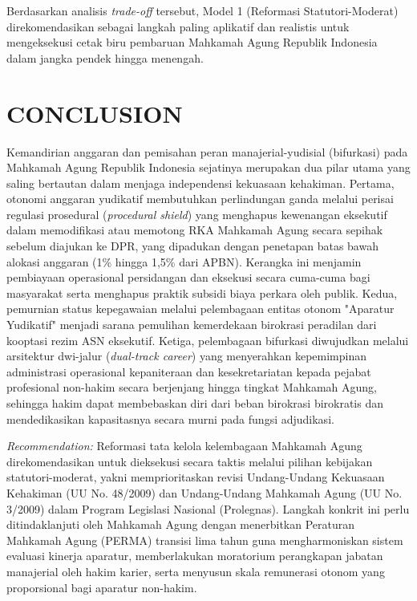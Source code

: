 \documentclass[12pt, a4paper]{article}
\begin{document}
Berdasarkan analisis \textit{trade-off} tersebut, Model 1 (Reformasi Statutori-Moderat) direkomendasikan sebagai langkah paling aplikatif dan realistis untuk mengeksekusi cetak biru pembaruan Mahkamah Agung Republik Indonesia dalam jangka pendek hingga menengah.

\section{CONCLUSION}

Kemandirian anggaran dan pemisahan peran manajerial-yudisial (bifurkasi) pada Mahkamah Agung Republik Indonesia sejatinya merupakan dua pilar utama yang saling bertautan dalam menjaga independensi kekuasaan kehakiman. Pertama, otonomi anggaran yudikatif membutuhkan perlindungan ganda melalui perisai regulasi prosedural (\textit{procedural shield}) yang menghapus kewenangan eksekutif dalam memodifikasi atau memotong RKA Mahkamah Agung secara sepihak sebelum diajukan ke DPR, yang dipadukan dengan penetapan batas bawah alokasi anggaran (1\% hingga 1,5\% dari APBN). Kerangka ini menjamin pembiayaan operasional persidangan dan eksekusi secara cuma-cuma bagi masyarakat serta menghapus praktik subsidi biaya perkara oleh publik. Kedua, pemurnian status kepegawaian melalui pelembagaan entitas otonom "Aparatur Yudikatif" menjadi sarana pemulihan kemerdekaan birokrasi peradilan dari kooptasi rezim ASN eksekutif. Ketiga, pelembagaan bifurkasi diwujudkan melalui arsitektur dwi-jalur (\textit{dual-track career}) yang menyerahkan kepemimpinan administrasi operasional kepaniteraan dan kesekretariatan kepada pejabat profesional non-hakim secara berjenjang hingga tingkat Mahkamah Agung, sehingga hakim dapat membebaskan diri dari beban birokrasi birokratis dan mendedikasikan kapasitasnya secara murni pada fungsi adjudikasi.

\textit{Recommendation:} Reformasi tata kelola kelembagaan Mahkamah Agung direkomendasikan untuk dieksekusi secara taktis melalui pilihan kebijakan statutori-moderat, yakni memprioritaskan revisi Undang-Undang Kekuasaan Kehakiman (UU No. 48/2009) dan Undang-Undang Mahkamah Agung (UU No. 3/2009) dalam Program Legislasi Nasional (Prolegnas). Langkah konkrit ini perlu ditindaklanjuti oleh Mahkamah Agung dengan menerbitkan Peraturan Mahkamah Agung (PERMA) transisi lima tahun guna mengharmoniskan sistem evaluasi kinerja aparatur, memberlakukan moratorium perangkapan jabatan manajerial oleh hakim karier, serta menyusun skala remunerasi otonom yang proporsional bagi aparatur non-hakim.
\end{document}
